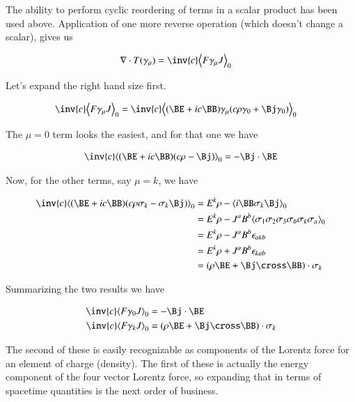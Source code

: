The ability to perform cyclic reordering of terms in a scalar product has been used above.  Application of one more
reverse operation (which doesn't change a scalar), gives us

\begin{align}\label{eqn:seLorentz:lorentzForceT}
\grad \cdot T(\gamma_\mu) &= \inv{c} \gpgradezero{ F \gamma_\mu J } 
\end{align}

Let's expand the right hand size first.

\begin{align*}
\inv{c} \gpgradezero{ F \gamma_\mu J } &= \inv{c} \gpgradezero{ (\BE + i c \BB) \gamma_\mu (c \rho \gamma_0 + \Bj \gamma_0) } 
\end{align*}

The $\mu = 0$ term looks the easiest, and for that one we have

\begin{align*}
\inv{c} \gpgradezero{ (\BE + i c \BB) (c \rho - \Bj) }  = -\Bj \cdot \BE
\end{align*}

Now, for the other terms, say $\mu = k$, we have

\begin{align*}
\inv{c} \gpgradezero{ (\BE + i c \BB) (c \rho \sigma_k - \sigma_k \Bj ) } 
&= E^k \rho - \gpgradezero{ i \BB \sigma_k \Bj }  \\
&= E^k \rho - J^a B^b \gpgradezero{ \sigma_1 \sigma_2 \sigma_3 \sigma_b \sigma_k \sigma_a }  \\
&= E^k \rho - J^a B^b \epsilon_{a k b} \\
&= E^k \rho + J^a B^b \epsilon_{k a b} \\
&= (\rho \BE + \Bj \cross \BB) \cdot \sigma_k
\end{align*}

Summarizing the two results we have

\begin{align}\label{eqn:seLorentz:lorentzForcePair}
\inv{c} \gpgradezero{ F \gamma_0 J } &= -\Bj \cdot \BE \\
\inv{c} \gpgradezero{ F \gamma_k J } &= (\rho \BE + \Bj \cross \BB) \cdot \sigma_k
\end{align}

The second of these is easily recognizable as components of the Lorentz force for an element of charge (density).  The first
of these is actually the energy component of the four vector Lorentz force, so expanding that in terms of spacetime quantities
is the next order of business.


